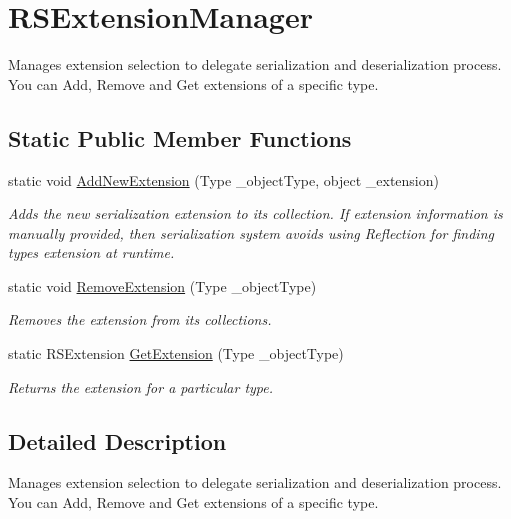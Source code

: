 \hypertarget{class_r_s_extension_manager}{}\section{R\+S\+Extension\+Manager}
\label{class_r_s_extension_manager}


Manages extension selection to delegate serialization and deserialization process. You can Add, Remove and Get extensions of a specific type.  


\subsection*{Static Public Member Functions}
\begin{DoxyCompactItemize}
\item 
static void \hyperlink{class_r_s_extension_manager_aa6453ae6dc5b3b09be742882e5d0f5ff}{Add\+New\+Extension} (Type \+\_\+object\+Type, object \+\_\+extension)
\begin{DoxyCompactList}\small\item\em Adds the new serialization extension to its collection. If extension information is manually provided, then serialization system avoids using Reflection for finding type\textquotesingle{}s extension at runtime. \end{DoxyCompactList}\item 
static void \hyperlink{class_r_s_extension_manager_afde649bf8e42a8cf43fee5fdf93745f2}{Remove\+Extension} (Type \+\_\+object\+Type)
\begin{DoxyCompactList}\small\item\em Removes the extension from its collections. \end{DoxyCompactList}\item 
static R\+S\+Extension \hyperlink{class_r_s_extension_manager_ac7cba4b934a8ba04b95604ac214ab892}{Get\+Extension} (Type \+\_\+object\+Type)
\begin{DoxyCompactList}\small\item\em Returns the extension for a particular type. \end{DoxyCompactList}\end{DoxyCompactItemize}


\subsection{Detailed Description}
Manages extension selection to delegate serialization and deserialization process. You can Add, Remove and Get extensions of a specific type. 



